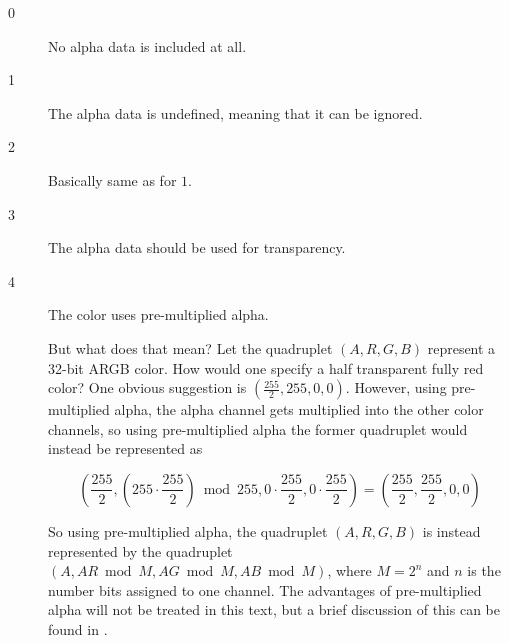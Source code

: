 \begin{description}
  \item[0] No alpha data is included at all.
  \item[1] The alpha data is undefined, meaning that it can be ignored.
  \item[2] Basically same as for $1$.
  \item[3] The alpha data should be used for transparency.
  \item[4] The color uses pre-multiplied alpha.

    But what does that mean? Let the quadruplet $(A,R,G,B)$ represent
    a 32-bit ARGB color. How would one specify a half transparent
    fully red color? One obvious suggestion is
    $\left(\frac{255}{2},255,0,0\right)$. However, using
    pre-multiplied alpha, the alpha channel gets multiplied into the
    other color channels, so using pre-multiplied alpha the former
    quadruplet would instead be represented as

    \begin{equation*}
    \left(
    \frac{255}{2},
    \left(255 \cdot \frac{255}{2}\right) \bmod 255,
    0 \cdot \frac{255}{2},
    0 \cdot \frac{255}{2}\right)  =  \left(\frac{255}{2},\frac{255}{2}, 0, 0\right)
    \end{equation*}

    So using pre-multiplied alpha, the quadruplet $(A,R,G,B)$ is
    instead represented by the quadruplet $\left(A, AR \bmod M, AG
      \bmod M, AB \bmod M \right)$, where $M=2^n$ and $n$ is the
    number bits assigned to one channel. The advantages of
    pre-multiplied alpha will not be treated in this text, but a brief
    discussion of this can be found in \cite{porter84_compos_dig_img}.


\end{description}


